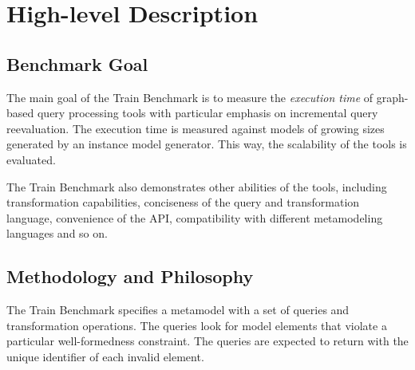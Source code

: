 \chapter{High-level Description}

\section{Benchmark Goal}

The main goal of the Train Benchmark is to measure the \emph{execution time} of graph-based query processing tools with particular emphasis on incremental query reevaluation. The execution time is measured against models of growing sizes generated by an instance model generator. This way, the scalability of the tools is evaluated.

The Train Benchmark also demonstrates other abilities of the tools, including transformation capabilities, conciseness of the query and transformation language, convenience of the API, compatibility with different metamodeling languages and so on.

\section{Methodology and Philosophy}

The Train Benchmark specifies a metamodel with a set of queries and transformation operations. The queries look for model elements that violate a particular well-formedness constraint. The queries are expected to return with the unique identifier of each invalid element.

